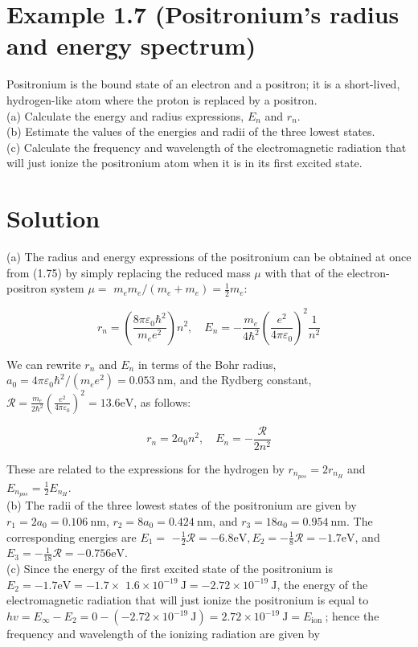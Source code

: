 \documentclass[10pt]{article}
\begin{document}
\section*{Example 1.7 (Positronium's radius and energy spectrum)}
Positronium is the bound state of an electron and a positron; it is a short-lived, hydrogen-like atom where the proton is replaced by a positron.\\
(a) Calculate the energy and radius expressions, $E_{n}$ and $r_{n}$.\\
(b) Estimate the values of the energies and radii of the three lowest states.\\
(c) Calculate the frequency and wavelength of the electromagnetic radiation that will just ionize the positronium atom when it is in its first excited state.

\section*{Solution}
(a) The radius and energy expressions of the positronium can be obtained at once from (1.75) by simply replacing the reduced mass $\mu$ with that of the electron-positron system $\mu=$ $m_{e} m_{e} /\left(m_{e}+m_{e}\right)=\frac{1}{2} m_{e}:$


\begin{equation*}
r_{n}=\left(\frac{8 \pi \varepsilon_{0} \hbar^{2}}{m_{e} e^{2}}\right) n^{2}, \quad E_{n}=-\frac{m_{e}}{4 \hbar^{2}}\left(\frac{e^{2}}{4 \pi \varepsilon_{0}}\right)^{2} \frac{1}{n^{2}} \tag{1.82}
\end{equation*}


We can rewrite $r_{n}$ and $E_{n}$ in terms of the Bohr radius, $a_{0}=4 \pi \varepsilon_{0} \hbar^{2} /\left(m_{e} e^{2}\right)=0.053 \mathrm{~nm}$, and the Rydberg constant, $\mathcal{R}=\frac{m_{e}}{2 \hbar^{2}}\left(\frac{e^{2}}{4 \pi \varepsilon_{0}}\right)^{2}=13.6 \mathrm{eV}$, as follows:


\begin{equation*}
r_{n}=2 a_{0} n^{2}, \quad E_{n}=-\frac{\mathcal{R}}{2 n^{2}} \tag{1.83}
\end{equation*}


These are related to the expressions for the hydrogen by $r_{n_{p o s}}=2 r_{n_{H}}$ and $E_{n_{p o s}}=\frac{1}{2} E_{n_{H}}$.\\
(b) The radii of the three lowest states of the positronium are given by $r_{1}=2 a_{0}=0.106 \mathrm{~nm}$, $r_{2}=8 a_{0}=0.424 \mathrm{~nm}$, and $r_{3}=18 a_{0}=0.954 \mathrm{~nm}$. The corresponding energies are $E_{1}=$ $-\frac{1}{2} \mathcal{R}=-6.8 \mathrm{eV}, E_{2}=-\frac{1}{8} \mathcal{R}=-1.7 \mathrm{eV}$, and $E_{3}=-\frac{1}{18} \mathcal{R}=-0.756 \mathrm{eV}$.\\
(c) Since the energy of the first excited state of the positronium is $E_{2}=-1.7 \mathrm{eV}=-1.7 \times$ $1.6 \times 10^{-19} \mathrm{~J}=-2.72 \times 10^{-19} \mathrm{~J}$, the energy of the electromagnetic radiation that will just ionize the positronium is equal to $h v=E_{\infty}-E_{2}=0-\left(-2.72 \times 10^{-19} \mathrm{~J}\right)=2.72 \times 10^{-19} \mathrm{~J}=E_{\text {ion }}$; hence the frequency and wavelength of the ionizing radiation are given by
\end{document}
